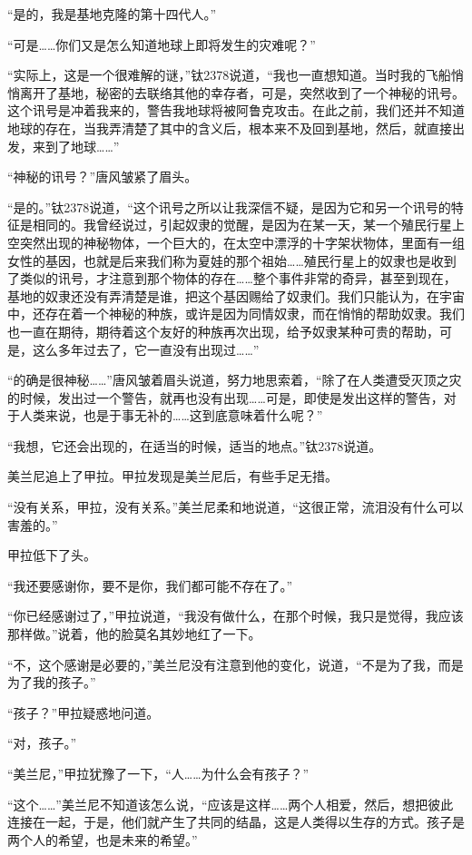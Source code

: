“是的，我是基地克隆的第十四代人。” 

“可是……你们又是怎么知道地球上即将发生的灾难呢？” 

“实际上，这是一个很难解的谜，”钛2378说道，“我也一直想知道。当时我的飞船悄悄离开了基地，秘密的去联络其他的幸存者，可是，突然收到了一个神秘的讯号。这个讯号是冲着我来的，警告我地球将被阿鲁克攻击。在此之前，我们还并不知道地球的存在，当我弄清楚了其中的含义后，根本来不及回到基地，然后，就直接出发，来到了地球……” 

“神秘的讯号？”唐风皱紧了眉头。 

“是的。”钛2378说道，“这个讯号之所以让我深信不疑，是因为它和另一个讯号的特征是相同的。我曾经说过，引起奴隶的觉醒，是因为在某一天，某一个殖民行星上空突然出现的神秘物体，一个巨大的，在太空中漂浮的十字架状物体，里面有一组女性的基因，也就是后来我们称为夏娃的那个祖始……殖民行星上的奴隶也是收到了类似的讯号，才注意到那个物体的存在……整个事件非常的奇异，甚至到现在，基地的奴隶还没有弄清楚是谁，把这个基因赐给了奴隶们。我们只能认为，在宇宙中，还存在着一个神秘的种族，或许是因为同情奴隶，而在悄悄的帮助奴隶。我们也一直在期待，期待着这个友好的种族再次出现，给予奴隶某种可贵的帮助，可是，这么多年过去了，它一直没有出现过……” 

“的确是很神秘……”唐风皱着眉头说道，努力地思索着，“除了在人类遭受灭顶之灾的时候，发出过一个警告，就再也没有出现……可是，即使是发出这样的警告，对于人类来说，也是于事无补的……这到底意味着什么呢？” 

“我想，它还会出现的，在适当的时候，适当的地点。”钛2378说道。 

美兰尼追上了甲拉。甲拉发现是美兰尼后，有些手足无措。 

“没有关系，甲拉，没有关系。”美兰尼柔和地说道，“这很正常，流泪没有什么可以害羞的。” 

甲拉低下了头。 

“我还要感谢你，要不是你，我们都可能不存在了。” 

“你已经感谢过了，”甲拉说道，“我没有做什么，在那个时候，我只是觉得，我应该那样做。”说着，他的脸莫名其妙地红了一下。 

“不，这个感谢是必要的，”美兰尼没有注意到他的变化，说道，“不是为了我，而是为了我的孩子。” 

“孩子？”甲拉疑惑地问道。 

“对，孩子。” 

“美兰尼，”甲拉犹豫了一下，“人……为什么会有孩子？” 

“这个……”美兰尼不知道该怎么说，“应该是这样……两个人相爱，然后，想把彼此连接在一起，于是，他们就产生了共同的结晶，这是人类得以生存的方式。孩子是两个人的希望，也是未来的希望。” 

